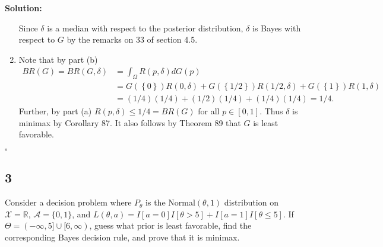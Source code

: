 \documentclass[12pt]{article}
\newcounter{ProofCounter}
\newenvironment{Solution}{\stepcounter{ProofCounter}\textbf{Solution:}}{\hfill$\square$}
\begin{document}
\begin{Solution}
\begin{enumerate}[label=(\alph*), leftmargin=6mm]
      Since $\delta$ is a median with respect to the posterior distribution, $\delta$ is Bayes with respect to $G$ by the remarks on 33 of section
      4.5.


    \item Note that by part (b)
      \begin{align*}
        BR(G) = BR(G, \delta)& = \int_{\Omega}R(p, \delta)dG(p) \\
        & = G(\left\{ 0 \right\}) R(0,\delta) + G(\left\{ 1/2 \right\})R(1/2, \delta) + G(\left\{ 1 \right\})R(1,\delta) \\
        & = (1/4)(1/4) + (1/2)(1/4) + (1/4)(1/4) = 1/4.
      \end{align*}
      Further, by part (a) $R(p, \delta) \leq 1/4 = BR(G)$ for all $p \in [0,1]$. Thus $\delta$ is minimax by Corollary 87. It also follows by Theorem
      89 that $G$ is least favorable.
  \end{enumerate}
\end{Solution}

\newpage
\subsection*{3}
\begin{tcolorbox}
  Consider a decision problem where $P_\theta$ is the Normal$(\theta,1)$ distribution on $\mathcal{X}=\mathbb{R}$, $\mathcal{A}=\{0,1\}$, and $L(\theta,a)=I[a=0]I[\theta>5] + I[a=1]I[\theta \leq 5]$.  If $\Theta= (-\infty,5] \cup [6,\infty)$, guess what prior is least favorable, find the corresponding Bayes decision rule, and prove that it is minimax.
\end{tcolorbox}
\end{document}
